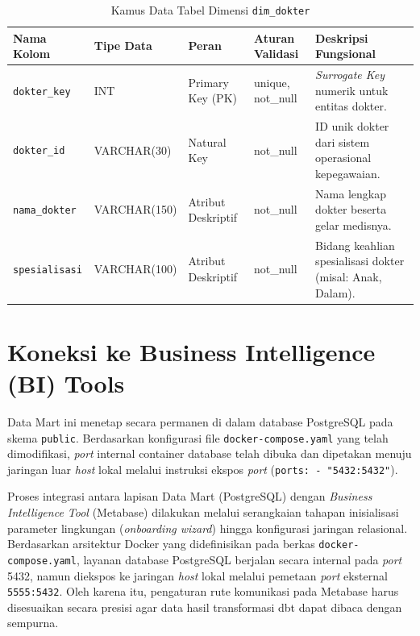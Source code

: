 \begin{table}[H]
\centering
\caption{Kamus Data Tabel Dimensi \texttt{dim\_dokter}}
\small
\begin{tabularx}{\linewidth}{p{2.8cm}p{2cm}p{2.8cm}p{2.8cm}X}
\toprule
\textbf{Nama Kolom} & \textbf{Tipe Data} & \textbf{Peran} & \textbf{Aturan Validasi} & \textbf{Deskripsi Fungsional} \\
\midrule
\texttt{dokter\_key}   & INT          & Primary Key (PK)   & unique, not\_null & \textit{Surrogate Key} numerik untuk entitas dokter. \\
\texttt{dokter\_id}    & VARCHAR(30)  & Natural Key        & not\_null         & ID unik dokter dari sistem operasional kepegawaian. \\
\texttt{nama\_dokter}  & VARCHAR(150) & Atribut Deskriptif & not\_null         & Nama lengkap dokter beserta gelar medisnya. \\
\texttt{spesialisasi}  & VARCHAR(100) & Atribut Deskriptif & not\_null         & Bidang keahlian spesialisasi dokter (misal: Anak, Dalam). \\
\bottomrule
\end{tabularx}
\end{table}
 
\section{Koneksi ke Business Intelligence (BI) Tools}
 
Data Mart ini menetap secara permanen di dalam database PostgreSQL pada skema \texttt{public}. Berdasarkan konfigurasi file \texttt{docker-compose.yaml} yang telah dimodifikasi, \textit{port} internal container database telah dibuka dan dipetakan menuju jaringan luar \textit{host} lokal melalui instruksi ekspos \textit{port} (\texttt{ports: - "5432:5432"}).
 
Proses integrasi antara lapisan Data Mart (PostgreSQL) dengan \textit{Business Intelligence Tool} (Metabase) dilakukan melalui serangkaian tahapan inisialisasi parameter lingkungan (\textit{onboarding wizard}) hingga konfigurasi jaringan relasional. Berdasarkan arsitektur Docker yang didefinisikan pada berkas \texttt{docker-compose.yaml}, layanan database PostgreSQL berjalan secara internal pada \textit{port} 5432, namun diekspos ke jaringan \textit{host} lokal melalui pemetaan \textit{port} eksternal \texttt{5555:5432}. Oleh karena itu, pengaturan rute komunikasi pada Metabase harus disesuaikan secara presisi agar data hasil transformasi dbt dapat dibaca dengan sempurna.
 
